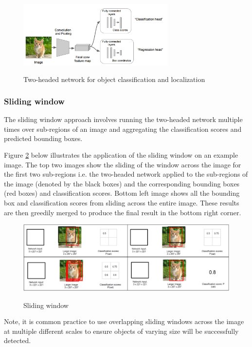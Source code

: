 \documentclass[twoside]{article}
\begin{document}
\begin{figure}[!htp]
\centering
{\includegraphics[width=0.70\textwidth]{img/two_headed_network.png}}
\caption{Two-headed network for object classification and localization}
\label{fig:two_headed_network}
\end{figure}

\subsubsection{Sliding window}

The sliding window approach \cite{sermanet2013overfeat} involves running the two-headed network multiple times over sub-regions of an image and aggregating the classification scores and predicted bounding boxes.

Figure \ref{fig:sliding_window} below illustrates the application of the sliding window on an example image. The top two images show the sliding of the window across the image for the first two sub-regions i.e. the two-headed network applied to the sub-regions of the image (denoted by the black  boxes) and the corresponding bounding boxes (red boxes) and classification scores.  Bottom left image shows all the bounding box and classification scores from sliding across the entire image. These results are then greedily merged to produce the final result in the bottom right corner.

\begin{figure}[!htp]
\centering
{\includegraphics[width=1.0\textwidth]{img/sliding_window.png}}
\caption{Sliding window}
\label{fig:sliding_window}
\end{figure}

Note, it is common practice to use overlapping sliding windows across the image at multiple different scales to ensure objects of varying size will be successfully detected.
\end{document}
